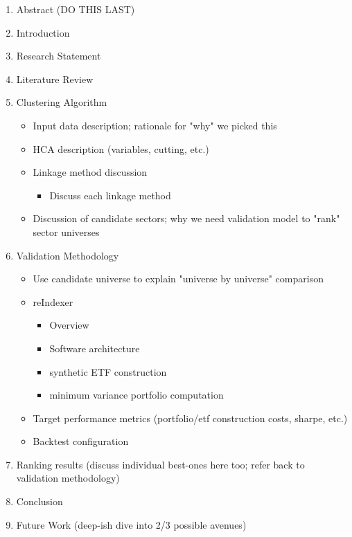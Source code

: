 \documentclass[../main.tex]{subfiles}
\begin{document}
\begin{enumerate}
    \item Abstract (DO THIS LAST)
    \item Introduction
    \item Research Statement
    \item Literature Review
    \item Clustering Algorithm
    \begin{itemize}
        \item Input data description; rationale for "why" we picked this
        \item HCA description (variables, cutting, etc.)
        \item Linkage method discussion
        \begin{itemize}
            \item Discuss each linkage method
        \end{itemize}
        \item Discussion of candidate sectors; why we need validation model to "rank" sector universes
    \end{itemize}
    \item Validation Methodology
    \begin{itemize}
        \item Use candidate universe to explain "universe by universe" comparison
        \item reIndexer
        \begin{itemize}
            \item Overview
            \item Software architecture
            \item synthetic ETF construction
            \item minimum variance portfolio computation
        \end{itemize}
        \item Target performance metrics (portfolio/etf construction costs, sharpe, etc.)
        \item Backtest configuration
    \end{itemize}
    \item Ranking results (discuss individual best-ones here too; refer back to validation methodology)
    \item Conclusion
    \item Future Work (deep-ish dive into 2/3 possible avenues)
\end{enumerate}
\end{document}
